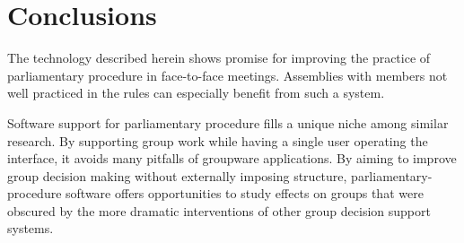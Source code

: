 \documentclass{book}
\begin{document}














\section{Conclusions}  %

The technology described herein shows promise for improving the practice of parliamentary procedure in face-to-face meetings. Assemblies with members not well practiced in the rules can especially benefit from such a system.


Software support for parliamentary procedure fills a unique niche among similar research. By supporting group work while having a single user operating the interface, it avoids many pitfalls of groupware applications. By aiming to improve group decision making without externally imposing structure, parliamentary-procedure software offers opportunities to study effects on groups that were obscured by the more dramatic interventions of other group decision support systems.
\end{document}
